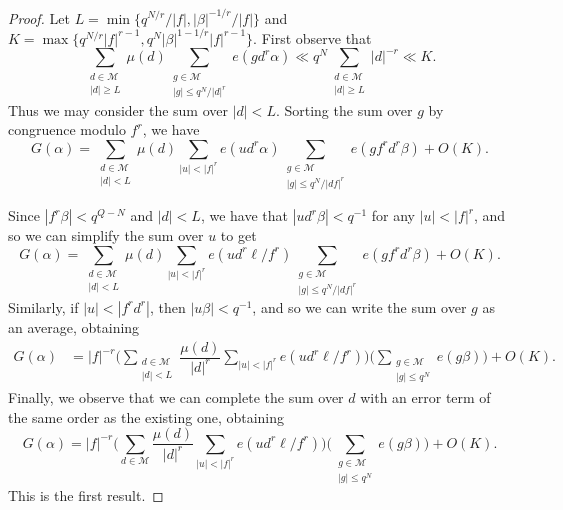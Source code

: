 \documentclass[10pt,a4paper]{amsart}
\def\calM{{\mathcal M}}
\begin{document}
\begin{proof}
    Let $L = \min\{q^{N/r}/|f|,|\beta|^{-1/r}/|f|\}$ and $K = \max\{q^{N/r}|f|^{r-1},q^N|\beta|^{1-1/r}|f|^{r-1}\}$. First observe that
    \[\sum_{\substack{d \in \calM \\ |d| \geq L}} \mu(d) \sum_{\substack{g \in \calM \\ |g| \leq q^N/|d|^r}}e(gd^r\alpha) \ll q^N \sum_{\substack{d \in \calM \\ |d| \geq L}} |d|^{-r}  \ll K.\]
    Thus we may consider the sum over $|d|<L$. Sorting the sum over $g$ by congruence modulo $f^r$, we have
    \[G(\alpha) = \sum_{\substack{d \in \calM \\ |d| < L}} \mu(d) \sum_{|u| < |f|^r}e(ud^r\alpha)\sum_{\substack{g \in \calM \\ |g| \leq q^N/|df|^r}} e(gf^rd^r\beta) + O(K).\]
    
    Since $|f^r\beta|<q^{Q-N}$ and $|d| < L$, we have that $|ud^r\beta|<q^{-1}$ for any $|u|<|f|^r$, and so we can simplify the sum over $u$ to get
    \[G(\alpha) = \sum_{\substack{d \in \calM \\ |d| < L}} \mu(d) \sum_{|u| < |f|^r}e(ud^r\ell/f^r)\sum_{\substack{g \in \calM \\ |g| \leq q^N/|df|^r}} e(gf^rd^r\beta) + O(K).\]
    Similarly, if $|u|<|f^rd^r|$, then $|u\beta| < q^{-1}$, and so we can write the sum over $g$ as an average, obtaining
    \begin{align*}
        G(\alpha) &= |f|^{-r}\bigg(\sum_{\substack{d \in \calM \\ |d| < L}} \dfrac{\mu(d)}{|d|^r} \sum_{|u| < |f|^r}e(ud^r\ell/f^r)\bigg)\bigg(\sum_{\substack{g \in \calM \\ |g| \leq q^N}} e(g\beta) \bigg)+ O(K).
    \end{align*}
    Finally, we observe that we can complete the sum over $d$ with an error term of the same order as the existing one, obtaining
    \[G(\alpha) = |f|^{-r}\bigg(\sum_{d \in \calM} \dfrac{\mu(d)}{|d|^r} \sum_{|u| < |f|^r}e(ud^r\ell/f^r)\bigg)\bigg(\sum_{\substack{g \in \calM \\ |g| \leq q^N}} e(g\beta) \bigg)+ O(K).\]
    This is the first result.


\end{proof}
\end{document}
